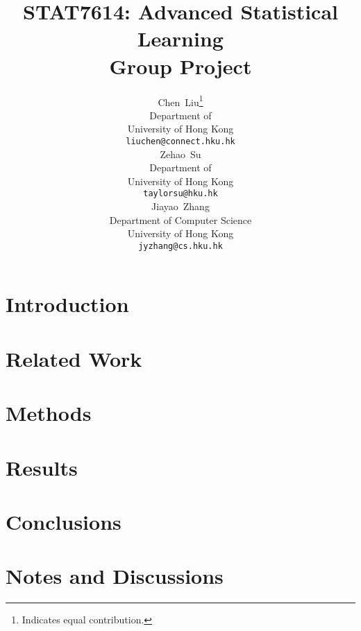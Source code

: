 \documentclass{article}
\title{STAT7614: Advanced Statistical Learning\\Group Project}
\author{
    Chen~Liu\thanks{Indicates equal contribution.}\\
    Department of\\
    University of Hong Kong\\
    \texttt{liuchen@connect.hku.hk}\\
  \And
    Zehao~Su\samethanks{} \\
    Department of \\
    University of Hong Kong \\
    \texttt{taylorsu@hku.hk} \\
  \AND
    Jiayao~Zhang\samethanks{} \\
    Department of Computer Science \\
    University of Hong Kong \\
    \texttt{jyzhang@cs.hku.hk} \\
}
\newcommand{\final}{0}
\begin{document}
\maketitle

\begin{abstract}

\end{abstract}

\section{Introduction}

\section{Related Work}

\section{Methods}

\section{Results}

\section{Conclusions}

{\small
\nocite{*}


}
\ifthenelse{\equal{\final}{0}}
{
\clearpage
{}
\section{Notes and Discussions}
\begin{description}

\end{description}
}
\end{document}
